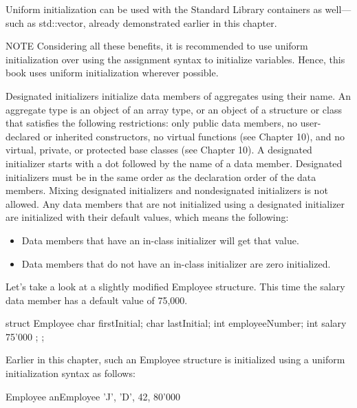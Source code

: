 Uniform initialization can be used with the Standard Library containers as well—such as std::vector, already demonstrated earlier in this chapter.

\begin{myNotic}{NOTE}
Considering all these benefits, it is recommended to use uniform initialization over using the assignment syntax to initialize variables. Hence, this book uses uniform initialization wherever possible.
\end{myNotic}


Designated initializers initialize data members of aggregates using their name. An aggregate type is an object of an array type, or an object of a structure or class that satisfies the following restrictions: only public data members, no user-declared or inherited constructors, no virtual functions (see Chapter 10), and no virtual, private, or protected base classes (see Chapter 10). A designated initializer starts with a dot followed by the name of a data member. Designated initializers must be in the same order as the declaration order of the data members. Mixing designated initializers and nondesignated initializers is not allowed. Any data members that are not initialized using a designated initializer are initialized with their default values, which means the following:

\begin{itemize}
\item
Data members that have an in-class initializer will get that value.

\item
Data members that do not have an in-class initializer are zero initialized.
\end{itemize}

Let’s take a look at a slightly modified Employee structure. This time the salary data member has a default value of 75,000.

\begin{cpp}
struct Employee {
    char firstInitial;
    char lastInitial;
    int employeeNumber;
    int salary { 75'000 };
};
\end{cpp}

Earlier in this chapter, such an Employee structure is initialized using a uniform initialization syntax as follows:

\begin{cpp}
Employee anEmployee { 'J', 'D', 42, 80'000 }
\end{cpp}

